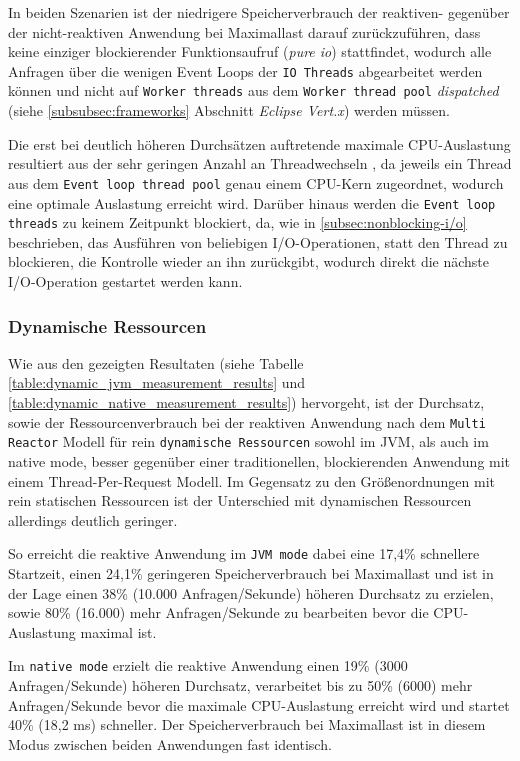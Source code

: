 In beiden Szenarien ist der niedrigere Speicherverbrauch der reaktiven- gegenüber der nicht-reaktiven Anwendung
bei Maximallast darauf zurückzuführen, dass
keine einziger blockierender Funktionsaufruf (\textit{pure io}) stattfindet, wodurch alle Anfragen über die wenigen
Event Loops der \verb|IO Threads| abgearbeitet werden können und nicht auf \verb|Worker threads| aus dem \verb|Worker thread pool|
\textit{dispatched} (siehe \ref{subsubsec:frameworks} Abschnitt \textit{Eclipse Vert.x}) werden müssen.

Die erst bei deutlich höheren Durchsätzen auftretende maximale CPU-Auslastung resultiert aus der sehr geringen Anzahl an Threadwechseln
, da jeweils ein Thread aus dem \verb|Event loop thread pool| genau einem CPU-Kern zugeordnet, wodurch eine optimale Auslastung erreicht
wird. Darüber hinaus werden die \verb|Event loop threads| zu keinem Zeitpunkt blockiert, da, wie in \ref{subsec:nonblocking-i/o}
beschrieben, das Ausführen von beliebigen I/O-Operationen, statt den Thread zu blockieren, die Kontrolle wieder an ihn zurückgibt,
wodurch direkt die nächste I/O-Operation gestartet werden kann.

\subsubsection{Dynamische Ressourcen}
\label{subsubsec:auswertung_dynamic}
Wie aus den gezeigten Resultaten (siehe Tabelle \ref{table:dynamic_jvm_measurement_results} und
\ref{table:dynamic_native_measurement_results}) hervorgeht, ist der Durchsatz, sowie der Ressourcenverbrauch bei der
reaktiven Anwendung nach dem \verb|Multi Reactor| Modell für rein \verb|dynamische Ressourcen| sowohl im JVM, als auch im native mode,
besser gegenüber einer traditionellen, blockierenden Anwendung mit einem Thread-Per-Request Modell. Im Gegensatz zu den
Größenordnungen mit rein statischen Ressourcen ist der Unterschied mit dynamischen Ressourcen allerdings deutlich geringer.

So erreicht die reaktive Anwendung im \verb|JVM mode| dabei eine 17,4\% schnellere Startzeit, einen 24,1\% geringeren
Speicherverbrauch bei Maximallast und ist in der Lage einen 38\% (10.000 Anfragen/Sekunde) höheren Durchsatz zu erzielen,
sowie 80\% (16.000) mehr Anfragen/Sekunde zu bearbeiten bevor die CPU-Auslastung maximal ist.

Im \verb|native mode| erzielt die reaktive Anwendung einen 19\% (3000 Anfragen/Sekunde) höheren Durchsatz, verarbeitet bis zu
50\% (6000) mehr Anfragen/Sekunde bevor die maximale CPU-Auslastung erreicht wird und startet 40\% (18,2 ms) schneller.
Der Speicherverbrauch bei Maximallast ist in diesem Modus zwischen beiden Anwendungen fast identisch.

